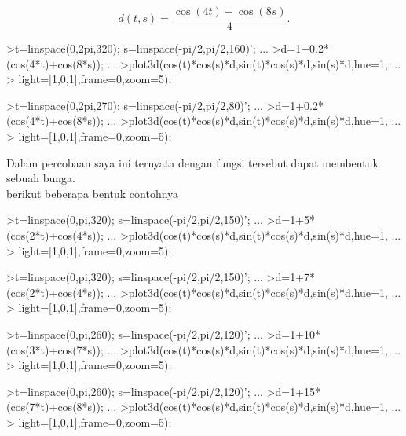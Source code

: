 \documentclass[a4paper,10pt]{article}
\begin{document}
\begin{eulernotebook}
\begin{eulercomment}
\begin{eulercomment}
\begin{eulercomment}
\end{eulercomment}
\begin{eulerformula}
\[
d(t,s) = \frac{\cos(4t)+\cos(8s)}{4}.
\]
\end{eulerformula}
\begin{eulerprompt}
>t=linspace(0,2pi,320); s=linspace(-pi/2,pi/2,160)'; ...
>d=1+0.2*(cos(4*t)+cos(8*s)); ...
>plot3d(cos(t)*cos(s)*d,sin(t)*cos(s)*d,sin(s)*d,hue=1, ...
>  light=[1,0,1],frame=0,zoom=5):
\end{eulerprompt}
\begin{eulerprompt}
>t=linspace(0,2pi,270); s=linspace(-pi/2,pi/2,80)'; ...
>d=1+0.2*(cos(4*t)+cos(8*s)); ...
>plot3d(cos(t)*cos(s)*d,sin(t)*cos(s)*d,sin(s)*d,hue=1, ...
>  light=[1,0,1],frame=0,zoom=5):
\end{eulerprompt}
\begin{eulercomment}
Dalam percobaan saya ini ternyata dengan fungsi tersebut dapat
membentuk sebuah bunga.\\
berikut beberapa bentuk contohnya
\end{eulercomment}
\begin{eulerprompt}
>t=linspace(0,pi,320); s=linspace(-pi/2,pi/2,150)'; ...
>d=1+5*(cos(2*t)+cos(4*s)); ...
>plot3d(cos(t)*cos(s)*d,sin(t)*cos(s)*d,sin(s)*d,hue=1, ...
>  light=[1,0,1],frame=0,zoom=5):
\end{eulerprompt}
\begin{eulerprompt}
>t=linspace(0,pi,320); s=linspace(-pi/2,pi/2,150)'; ...
>d=1+7*(cos(2*t)+cos(4*s)); ...
>plot3d(cos(t)*cos(s)*d,sin(t)*cos(s)*d,sin(s)*d,hue=1, ...
>  light=[1,0,1],frame=0,zoom=5):
\end{eulerprompt}
\begin{eulerprompt}
>t=linspace(0,pi,260); s=linspace(-pi/2,pi/2,120)'; ...
>d=1+10*(cos(3*t)+cos(7*s)); ...
>plot3d(cos(t)*cos(s)*d,sin(t)*cos(s)*d,sin(s)*d,hue=1, ...
>  light=[1,0,1],frame=0,zoom=5):
\end{eulerprompt}
\begin{eulerprompt}
>t=linspace(0,pi,260); s=linspace(-pi/2,pi/2,120)'; ...
>d=1+15*(cos(7*t)+cos(8*s)); ...
>plot3d(cos(t)*cos(s)*d,sin(t)*cos(s)*d,sin(s)*d,hue=1, ...
>  light=[1,0,1],frame=0,zoom=5):

\end{eulerprompt}
\end{eulercomment}
\end{eulercomment}
\end{eulernotebook}
\end{document}
